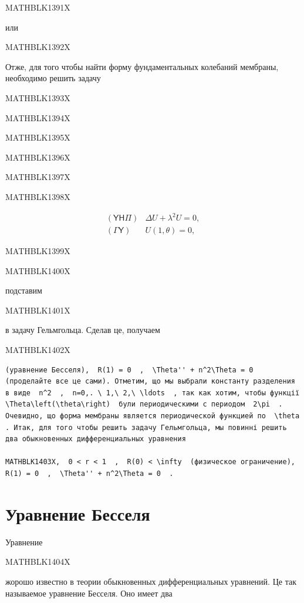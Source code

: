 \documentclass[
  ukrainian,
]{article}
\begin{document}
MATHBLK1391X

или

MATHBLK1392X

Отже, для того чтобы найти форму фундаментальных колебаний мембраны,
необходимо решить задачу

MATHBLK1393X

MATHBLK1394X

MATHBLK1395X

MATHBLK1396X

MATHBLK1397X

MATHBLK1398X

\[
\begin{aligned} (\mathsf{Y}\mathsf{H}\mathsf{\Pi}) & \Delta U + \lambda^2 U = 0, \\ (\mathsf{\Gamma}\mathsf{Y}) & U(1, \theta) = 0, \end{aligned}
\]

MATHBLK1399X

MATHBLK1400X

подставим

MATHBLK1401X

в задачу Гельмгольца. Сделав це, получаем

MATHBLK1402X

\begin{verbatim}
(уравнение Бесселя),  R(1) = 0  ,  \Theta'' + n^2\Theta = 0  (проделайте все це сами). Отметим, що мы выбрали константу разделения в виде  n^2  ,  n=0,. \ 1,\ 2,\ \ldots  , так как хотим, чтобы функції  \Theta\left(\theta\right)  були периодическими с периодом  2\pi  . Очевидно, що форма мембраны является периодической функцией по  \theta  . Итак, для того чтобы решить задачу Гельмгольца, мы повинні решить два обыкновенных дифференциальных уравнения

MATHBLK1403X,  0 < r < 1  ,  R(0) < \infty  (физическое ограничение),  R(1) = 0  ,  \Theta'' + n^2\Theta = 0  .
\end{verbatim}

\section{Уравнение
Бесселя}\label{ux443ux440ux430ux432ux43dux435ux43dux438ux435-ux431ux435ux441ux441ux435ux43bux44f}

Уравнение

MATHBLK1404X

жорошо известно в теории обыкновенных дифференциальных уравнений. Це так
называемое уравнение Бесселя. Оно имеет два
\end{document}
